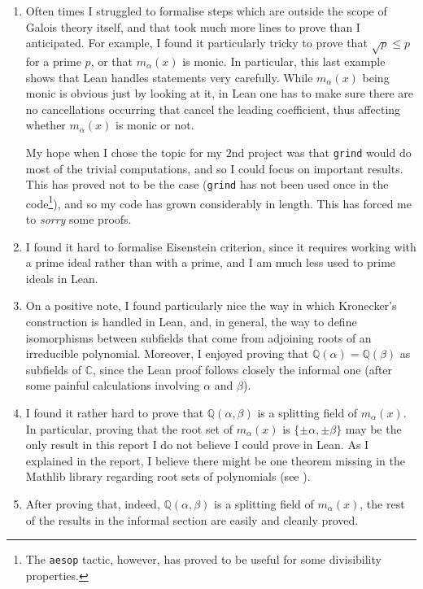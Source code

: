 \documentclass[a4paper,11pt]{article}
\theoremstyle{plain}
\newcommand{\Q}{\ensuremath{\mathbb{Q}}} %
\newcommand{\C}{\ensuremath{\mathbb{C}}} %
\begin{document}
	\begin{enumerate}
		
		\item Often times I struggled to formalise steps which are outside the scope of Galois theory itself, and that took much more lines to prove than I anticipated. For example, I found it particularly tricky to prove that $\sqrt{p}\leq p$ for a prime $p$, or that $m_\alpha(x)$ is monic. In particular, this last example shows that Lean handles statements very carefully. While $m_\alpha(x)$ being monic is obvious just by looking at it, in Lean one has to make sure there are no cancellations occurring that cancel the leading coefficient, thus affecting whether $m_\alpha(x)$ is monic or not. 
		
		My hope when I chose the topic for my $2$nd project was that \lstinline|grind| would do most of the trivial computations, and so I could focus on important results. This has proved not to be the case (\lstinline|grind| has not been used once in the code\footnote{The \lstinline|aesop| tactic, however, has proved to be useful for some divisibility properties.}), and so my code has grown considerably in length. This has forced me to \emph{sorry} some proofs.
		
		\item I found it hard to formalise Eisenstein criterion, since it requires working with a prime ideal rather than with a prime, and I am much less used to prime ideals in Lean.
		
		\item On a positive note, I found particularly nice the way in which Kronecker's construction is handled in Lean, and, in general, the way to define isomorphisms between subfields that come from adjoining roots of an irreducible polynomial. Moreover, I enjoyed proving that $\Q(\alpha)=\Q(\beta)$ as subfields of $\C$, since the Lean proof follows closely the informal one (after some painful calculations involving $\alpha$ and $\beta$).
		
		\item I found it rather hard to prove that $\Q(\alpha,\beta)$ is a splitting field of $m_\alpha(x)$. In particular, proving that the root set of $m_\alpha(x)$ is $\{\pm\alpha, \pm\beta\}$ may be the only result in this report I do not believe I could prove in Lean. As I explained in the report, I believe there might be one theorem missing in the Mathlib library regarding root sets of polynomials (see ).
		
		\item After proving that, indeed, $\Q(\alpha,\beta)$ is a splitting field of $m_\alpha(x)$, the rest of the results in the informal section are easily and cleanly proved.
		
		\end{enumerate}
		
\end{document}
